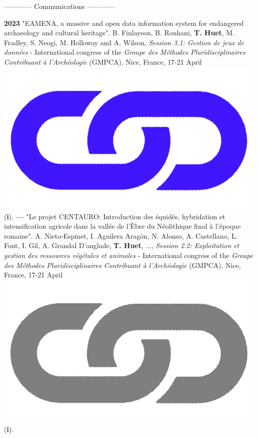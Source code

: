 \documentclass{article}
\begin{document}
\begin{center}------------ Communications ------------\end{center}
\smallbreak
\textbf{2023 }"EAMENA, a massive and open data information system for endangered archaeology and cultural heritage". B. Finlayson, B. Rouhani, \textbf{T. Huet}, M. Fradley, S. Neogi, M. Holloway and A. Wilson, \textit{Session 3.1: Gestion de jeux de données} - International congress of the \textit{Groupe des Méthodes Pluridisciplinaires Contribuant à l'Archéologie} (GMPCA), Nice, France, 17-21 April \href{https://eamena-project.github.io/eamena-arches-dev/talks/2023-gmpca/pres/#/title-slide}{\includegraphics[scale=0.02]{link_darkblue.png}} (\textbf{i}).
\smallbreak
\textbf{--- }"Le projet CENTAURO: Introduction des équidés, hybridation et intensification agricole dans la vallée de l'Èbre du Néolithique final à l'époque romaine". A. Nieto-Espinet, I. Aguilera Aragón, N. Alonso, A. Castellano, L. Font, I. Gil, A. Grandal D'anglade, \textbf{T. Huet}, ..., \textit{Session 2.2: Exploitation et gestion des ressources végétales et animales} - International congress of the \textit{Groupe des Méthodes Pluridisciplinaires Contribuant à l'Archéologie} (GMPCA), Nice, France, 17-21 April \href{https://gmpca2023.sciencesconf.org/}{\includegraphics[scale=0.02]{link_grey.png}} (\textbf{i}).
\end{document}
